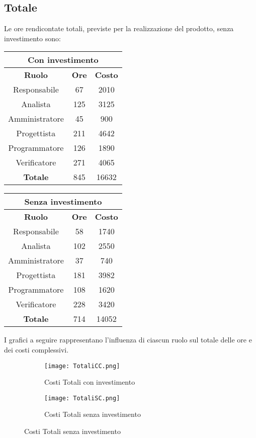 \documentclass{scalatekids-article}
\begin{document}
\subsection{Totale}
Le ore rendicontate totali, previste per la realizzazione del prodotto, senza
investimento sono:
\begin{center}
  \normalsize
  \begin{tabular}{| c | c | c |}
    \hline
    \multicolumn{3}{|c|}{\textbf{Con investimento}}\\
    \hline
    \textbf{Ruolo} & \textbf{Ore} & \textbf{Costo}\\
    \hline
    Responsabile & 67 & 2010 \\
    Analista & 125 & 3125\\
    Amministratore & 45 & 900\\
    Progettista & 211 & 4642\\
    Programmatore & 126 & 1890\\
    Verificatore & 271 & 4065\\
    \hline
    \textbf{Totale} & 845 & 16632\\
    \hline
  \end{tabular}
  \qquad
  \begin{tabular}{| c | c | c |}
    \hline
    \multicolumn{3}{|c|}{\textbf{Senza investimento}}\\
    \hline
    \textbf{Ruolo} & \textbf{Ore} & \textbf{Costo}\\
    \hline
    Responsabile & 58 & 1740\\
    Analista & 102 & 2550\\
    Amministratore & 37 & 740\\
    Progettista & 181 & 3982\\
    Programmatore & 108 & 1620\\
    Verificatore & 228 & 3420\\
    \hline
    \textbf{Totale} & 714 & 14052 \\
    \hline
  \end{tabular}
\end{center}
I grafici a seguire rappresentano l'influenza di ciascun ruolo sul totale delle ore e dei costi complessivi.
\begin{figure}[H]
  \begin{subfigure}[H]{0.47\textwidth}
    \texttt{[image: TotaliCC.png]}
    \caption*{Costi Totali con investimento}
  \end{subfigure}
  \qquad
  \begin{subfigure}[H]{0.47\textwidth}
    \texttt{[image: TotaliSC.png]}
    \caption*{Costi Totali senza investimento}
  \end{subfigure}
\end{figure}
\end{document}
